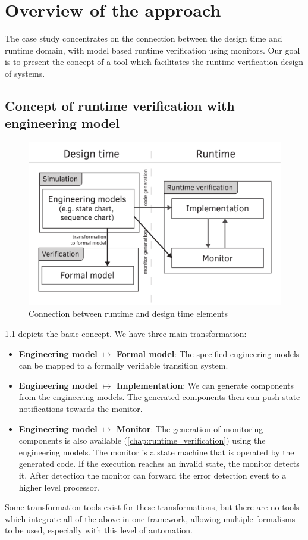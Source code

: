 \chapter{Overview of the approach}
\label{chap:overview}

The case study concentrates on the connection between the design time and runtime domain, with model based runtime verification using monitors. Our goal is to present the concept of a tool which facilitates the runtime verification design of systems.

\section{Concept of runtime verification with engineering model}

\begin{figure}[h]
	\centering
	\includegraphics[width=0.6\linewidth]{include/figures/chapter_3/abstract_overview}
	\caption{Connection between runtime and design time elements}
	\label{fig:overview:abstract_overview}
\end{figure}

\cref{fig:overview:abstract_overview} depicts the basic concept. We have three main transformation:
\begin{itemize}
	\item \textbf{Engineering model $\mapsto$ Formal model}: The specified engineering models can be mapped to a formally verifiable transition system.
	\item \textbf{Engineering model $\mapsto$ Implementation}: We can generate components from the engineering models. The generated components then can push state notifications towards the monitor.
	\item \textbf{Engineering model $\mapsto$ Monitor}: The generation of monitoring components is also available (\vref{chap:runtime_verification}) using the engineering models. The monitor is a state machine that is operated by the generated code. If the execution reaches an invalid state, the monitor detects it. After detection the monitor can forward the error detection event to a higher level processor.
\end{itemize}
Some transformation tools exist for these transformations, but there are no tools which integrate all of the above in one framework, allowing multiple formalisms to be used, especially with this level of automation.
\\[1ex]

